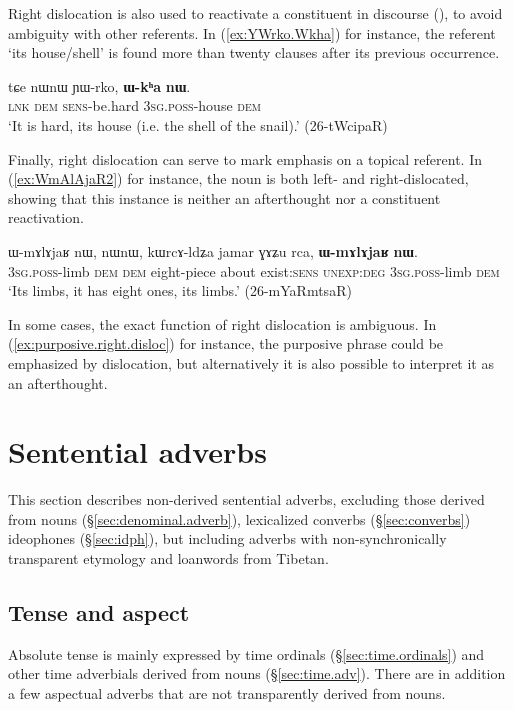 Right dislocation is also used to reactivate a constituent in discourse (\citealt[§13.7.2]{honkasalo19geshiza}), to avoid ambiguity with other referents. In (\ref{ex:YWrko.Wkha}) for instance, the referent  `its house/shell' is found more than twenty clauses after its previous occurrence.

\begin{exe}
\ex \label{ex:YWrko.Wkha}
\gll tɕe nɯnɯ ɲɯ-rko, \textbf{ɯ-kʰa} \textbf{nɯ}. \\
\textsc{lnk} \textsc{dem} \textsc{sens}-be.hard \textsc{3sg}.\textsc{poss}-house \textsc{dem} \\
\glt `It is hard, its house (i.e. the shell of the snail).' (26-tWcipaR)
\end{exe}

Finally, right dislocation can serve to mark emphasis on a topical referent. In (\ref{ex:WmAlAjaR2}) for instance, the noun  is both left- and right-dislocated, showing that this instance is neither an afterthought nor a constituent reactivation.

\begin{exe}
\ex \label{ex:WmAlAjaR2}
\gll ɯ-mɤlɤjaʁ nɯ, nɯnɯ, kɯrcɤ-ldʑa jamar ɣɤʑu rca, \textbf{ɯ-mɤlɤjaʁ} \textbf{nɯ}. \\
\textsc{3sg}.\textsc{poss}-limb \textsc{dem} \textsc{dem} eight-piece about exist:\textsc{sens} \textsc{unexp}:\textsc{deg} \textsc{3sg}.\textsc{poss}-limb \textsc{dem}  \\
\glt `Its limbs, it has eight ones, its limbs.' (26-mYaRmtsaR)
\end{exe}

In some cases, the exact function of right dislocation is ambiguous. In (\ref{ex:purposive.right.disloc}) for instance, the purposive phrase could be emphasized by dislocation, but alternatively it is also possible to interpret it as an afterthought.

\section{Sentential adverbs} \label{sec:sentential.adverbs}
This section describes non-derived sentential adverbs, excluding those derived from nouns (§\ref{sec:denominal.adverb}), lexicalized converbs (§\ref{sec:converbs})  ideophones (§\ref{sec:idph}), but including adverbs with non-synchronically transparent etymology and loanwords from Tibetan.
 
\subsection{Tense and aspect} \label{sec:tense.aspect.adverbs}
 
Absolute tense is mainly expressed by time ordinals (§\ref{sec:time.ordinals}) and other time adverbials derived from nouns (§\ref{sec:time.adv}). There are in addition a few aspectual adverbs that are not transparently derived from nouns.

